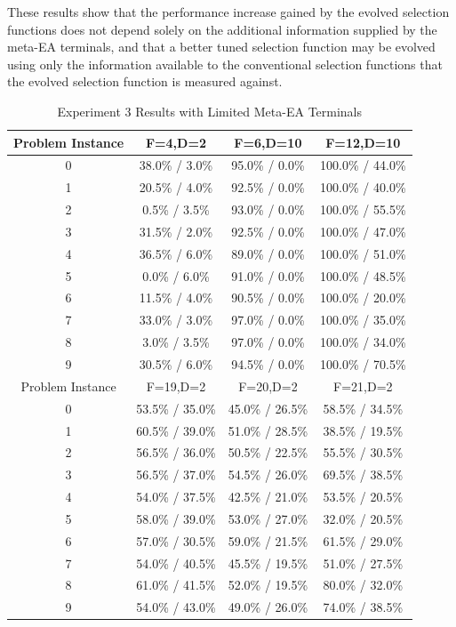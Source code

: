 \documentclass[sigconf]{acmart}
\begin{document}
These results show that the performance increase gained by the evolved selection functions does not depend solely on the additional information supplied by the meta-EA terminals, and that a better tuned selection function may be evolved using only the information available to the conventional selection functions that the evolved selection function is measured against.

\begin{table}
	\centering
	\caption{Experiment 3 Results with Limited Meta-EA Terminals}
	\label{tab:experiment3AddendumResults}
	\begin{tabular}{cccc}
		\toprule
		Problem Instance & F=4,D=2 & F=6,D=10 & F=12,D=10\\
		\hline
		0 & 38.0\% / 3.0\% & 95.0\% / 0.0\% & 100.0\% / 44.0\%\\
		\hline
		1 & 20.5\% / 4.0\% & 92.5\% / 0.0\% & 100.0\% / 40.0\%\\
		\hline
		2 & 0.5\% / 3.5\% & 93.0\% / 0.0\% & 100.0\% / 55.5\%\\
		\hline
		3 & 31.5\% / 2.0\% & 92.5\% / 0.0\% & 100.0\% / 47.0\%\\
		\hline
		4 & 36.5\% / 6.0\% & 89.0\% / 0.0\% & 100.0\% / 51.0\%\\
		\hline
		5 & 0.0\% / 6.0\% & 91.0\% / 0.0\% & 100.0\% / 48.5\%\\
		\hline
		6 & 11.5\% / 4.0\% & 90.5\% / 0.0\% & 100.0\% / 20.0\%\\
		\hline
		7 & 33.0\% / 3.0\% & 97.0\% / 0.0\% & 100.0\% / 35.0\%\\
		\hline
		8 & 3.0\% / 3.5\% & 97.0\% / 0.0\% & 100.0\% / 34.0\%\\
		\hline
		9 & 30.5\% / 6.0\% & 94.5\% / 0.0\% & 100.0\% / 70.5\%\\
		\hline
		\hline
		Problem Instance & F=19,D=2 & F=20,D=2 & F=21,D=2\\
		\hline
		0 & 53.5\% / 35.0\% & 45.0\% / 26.5\% & 58.5\% / 34.5\%\\
		\hline
		1 & 60.5\% / 39.0\% & 51.0\% / 28.5\% & 38.5\% / 19.5\%\\
		\hline
		2 & 56.5\% / 36.0\% & 50.5\% / 22.5\% & 55.5\% / 30.5\%\\
		\hline
		3 & 56.5\% / 37.0\% & 54.5\% / 26.0\% & 69.5\% / 38.5\%\\
		\hline
		4 & 54.0\% / 37.5\% & 42.5\% / 21.0\% & 53.5\% / 20.5\%\\
		\hline
		5 & 58.0\% / 39.0\% & 53.0\% / 27.0\% & 32.0\% / 20.5\%\\
		\hline
		6 & 57.0\% / 30.5\% & 59.0\% / 21.5\% & 61.5\% / 29.0\%\\
		\hline
		7 & 54.0\% / 40.5\% & 45.5\% / 19.5\% & 51.0\% / 27.5\%\\
		\hline
		8 & 61.0\% / 41.5\% & 52.0\% / 19.5\% & 80.0\% / 32.0\%\\
		\hline
		9 & 54.0\% / 43.0\% & 49.0\% / 26.0\% & 74.0\% / 38.5\%\\
		
		\bottomrule
	\end{tabular}
\end{table}




 
\end{document}
